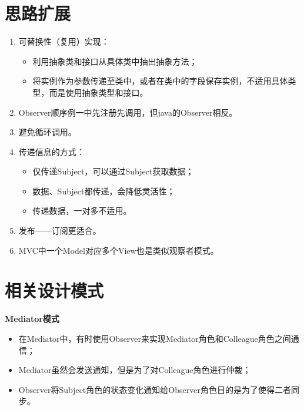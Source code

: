 \section{思路扩展}
\begin{enumerate}
	\item 可替换性（复用）实现：
	\begin{itemize}
		\item 利用抽象类和接口从具体类中抽出抽象方法；
		\item 将实例作为参数传递至类中，或者在类中的字段保存实例，不适用具体类型，而是使用抽象类型和接口。
	\end{itemize}
	\item Observer顺序例一中先注册先调用，但java的Observer相反。
	\item 避免循环调用。
	\item 传递信息的方式：
	\begin{itemize}
		\item 仅传递Subject，可以通过Subject获取数据；
		\item 数据、Subject都传递，会降低灵活性；
		\item 传递数据，一对多不适用。
	\end{itemize}
	\item 发布——订阅更适合。
	\item MVC中一个Model对应多个View也是类似观察者模式。
\end{enumerate}
\section{相关设计模式}
\noindent\textbf{Mediator模式}
\begin{itemize}
	\item 在Mediator中，有时使用Observer来实现Mediator角色和Colleague角色之间通信；
	\item Mediator虽然会发送通知，但是为了对Colleague角色进行仲裁；
	\item Observer将Subject角色的状态变化通知给Observer角色目的是为了使得二者同步。
\end{itemize}
